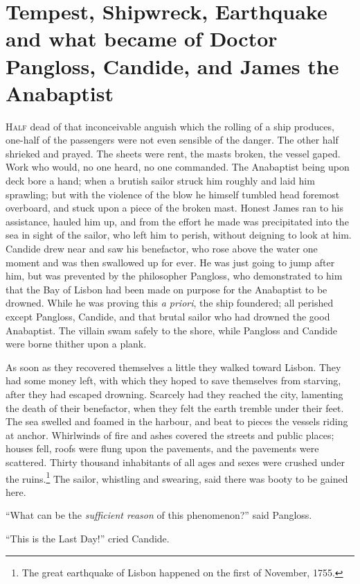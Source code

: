 \chapter{Tempest, Shipwreck, Earthquake and what became of Doctor Pangloss, Candide, and James the Anabaptist}
\lettrine[lraise=0.1,nindent=0em,slope=-.5em]{H}{alf} dead of that inconceivable anguish which the rolling of a ship produces, one-half of the passengers were not even sensible of the danger. The other half shrieked and prayed. The sheets were rent, the masts broken, the vessel gaped. Work who would, no one heard, no one commanded. The Anabaptist being upon deck bore a hand; when a brutish sailor struck him roughly and laid him sprawling; but with the violence of the blow he himself tumbled head foremost overboard, and stuck upon a piece of the broken mast. Honest James ran to his assistance, hauled him up, and from the effort he made was precipitated into the sea in sight of the sailor, who left him to perish, without deigning to look at him. Candide drew near and saw his benefactor, who rose above the water one moment and was then swallowed up for ever. He was just going to jump after him, but was prevented by the philosopher Pangloss, who demonstrated to him that the Bay of Lisbon had been made on purpose for the Anabaptist to be drowned. While he was proving this \textit{a priori}, the ship foundered; all perished except Pangloss, Candide, and that brutal sailor who had drowned the good Anabaptist. The villain swam safely to the shore, while Pangloss and Candide were borne thither upon a plank.

As soon as they recovered themselves a little they walked toward Lisbon. They had some money left, with which they hoped to save themselves from starving, after they had escaped drowning. Scarcely had they reached the city, lamenting the death of their benefactor, when they felt the earth tremble under their feet. The sea swelled and foamed in the harbour, and beat to pieces the vessels riding at anchor. Whirlwinds of fire and ashes covered the streets and public places; houses fell, roofs were flung upon the pavements, and the pavements were scattered. Thirty thousand inhabitants of all ages and sexes were crushed under the ruins.\footnote{The great earthquake of Lisbon happened on the first of November, 1755.} The sailor, whistling and swearing, said there was booty to be gained here.

``What can be the \textit{sufficient reason} of this phenomenon?'' said Pangloss.

``This is the Last Day!'' cried Candide.

